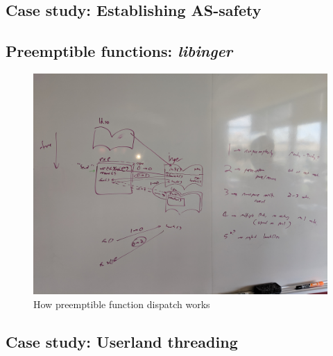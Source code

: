 \subsection{Case study: Establishing AS-safety}
\label{sec:statefulness}

\subsection{Preemptible functions: \textit{libinger}}
\label{sec:libinger}

\begin{figure}
\includegraphics[width=\columnwidth]{figs/calltree}
\caption{How preemptible function dispatch works}
\end{figure}

\subsection{Case study: Userland threading}
\label{sec:threading}



